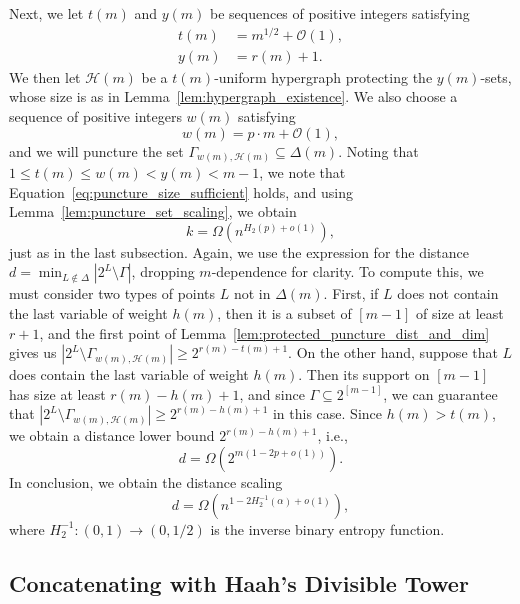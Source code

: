 \documentclass{article}
\begin{document}
Next, we let $t(m)$ and $y(m)$ be sequences of positive integers satisfying
\begin{align}
    t(m) &= m^{1/2} + \mathcal{O}(1),\\
    y(m) &= r(m) + 1.
\end{align}
We then let $\mathcal{H}(m)$ be a $t(m)$-uniform hypergraph protecting the $y(m)$-sets, whose size is as in Lemma~\ref{lem:hypergraph_existence}. We also choose a sequence of positive integers $w(m)$ satisfying
\begin{equation}
    w(m) = p\cdot m + \mathcal{O}(1),
\end{equation}
and we will puncture the set $\Gamma_{w(m), \mathcal{H}(m)} \subseteq \Delta(m)$. Noting that $1 \leq t(m) \leq w(m) < y(m) < m-1$, we note that Equation~\eqref{eq:puncture_size_sufficient} holds, and using Lemma~\ref{lem:puncture_set_scaling}, we obtain
\begin{equation}
    k = \Omega\left(n^{H_2(p)+o(1)}\right),
\end{equation}
just as in the last subsection. Again, we use the expression for the distance $d = \min_{L \notin \Delta}\left|2^L\setminus \Gamma\right|$, dropping $m$-dependence for clarity. To compute this, we must consider two types of points $L$ not in $\Delta(m)$. First, if $L$ does not contain the last variable of weight $h(m)$, then it is a subset of $[m-1]$ of size at least $r+1$, and the first point of Lemma~\ref{lem:protected_puncture_dist_and_dim} gives us $\left|2^L\setminus \Gamma_{w(m), \mathcal{H}(m)}\right| \geq 2^{r(m)-t(m)+1}$. On the other hand, suppose that $L$ does contain the last variable of weight $h(m)$. Then its support on $[m-1]$ has size at least $r(m)-h(m)+1$, and since $\Gamma \subseteq 2^{[m-1]}$, we can guarantee that $\left|2^L\setminus \Gamma_{w(m), \mathcal{H}(m)}\right| \geq 2^{r(m)-h(m)+1}$ in this case. Since $h(m) > t(m)$, we obtain a distance lower bound $2^{r(m)-h(m)+1}$, i.e.,
\begin{equation}
    d = \Omega\left(2^{m\left(1-2p+o(1)\right)}\right).
\end{equation}
In conclusion, we obtain the distance scaling
\begin{equation}
    d = \Omega\left(n^{1-2H_2^{-1}(\alpha)+o(1)}\right),
\end{equation}
where $H_2^{-1}:(0,1) \to (0,1/2)$ is the inverse binary entropy function.



\subsection{Concatenating with Haah's Divisible Tower}
\end{document}
